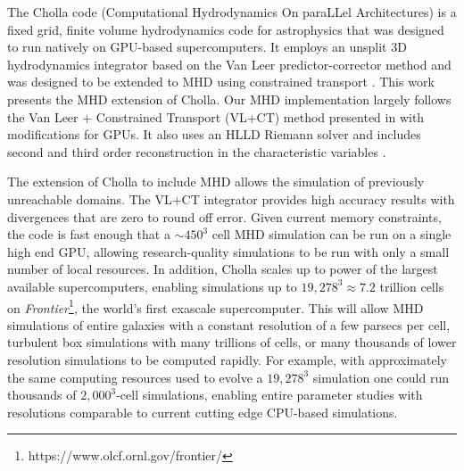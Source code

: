 The Cholla code (Computational Hydrodynamics On paraLLel Architectures) \citep{schneider_2015} is a fixed grid, finite volume hydrodynamics code for astrophysics that was designed to run natively on GPU-based supercomputers. It employs an unsplit 3D hydrodynamics integrator based on the Van Leer predictor-corrector method \citep{falle_1991, van_leer_2006} and was designed to be extended to MHD using constrained transport \citep{evans_1988, stone_athena_2008}. This work presents the MHD extension of Cholla. Our MHD implementation largely follows the Van Leer + Constrained Transport (VL+CT) method presented in \cite{stone_2009} with modifications for GPUs. It also uses an HLLD Riemann solver \citep{hlld_2005} and includes second \citep{stone_2009} and third \citep{felker_2018} order reconstruction in the characteristic variables \citep{stone_athena_2008}.

The extension of Cholla to include MHD allows the simulation of previously unreachable domains. The VL+CT integrator provides high accuracy results with divergences that are zero to round off error. Given current memory constraints, the code is fast enough that a $\sim450^3$ cell MHD simulation can be run on a single high end GPU, allowing research-quality simulations to be run with only a small number of local resources. In addition, Cholla scales up to power of the largest available supercomputers, enabling simulations up to $19,278^3 \approx 7.2$ trillion cells on \textit{Frontier}\footnote{https://www.olcf.ornl.gov/frontier/}, the world's first exascale supercomputer. This will allow MHD simulations of entire galaxies with a constant resolution of a few parsecs per cell, turbulent box simulations with many trillions of cells, or many thousands of lower resolution simulations to be computed rapidly. For example, with approximately the same computing resources used to evolve a $19,278^3$ simulation one could run thousands of $2,000^3$-cell simulations, enabling entire parameter studies with resolutions comparable to current cutting edge CPU-based simulations.

